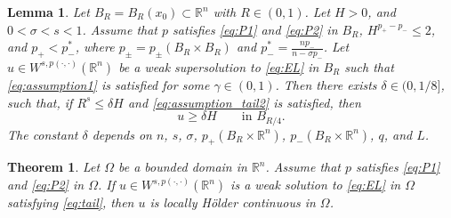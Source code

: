 \documentclass[10pt,a4paper]{amsart}
\newtheorem{theorem}{Theorem}
\newtheorem{lemma}{Lemma}
\begin{document}
 \begin{lemma} \label{lem:growth}
Let $B_R = B_R(x_0) \subset \mathbb{R}^n$ with $R \in (0,1)$. Let $H > 0$, and $0<\sigma < s <1$. Assume that $p$ satisfies \eqref{eq:P1} and \eqref{eq:P2} in $B_R$, $H^{p_+ - p_-} \leq 2$, and $p_+ < p_-^\ast$, where $p_\pm = p_\pm(B_R \times B_R)$ and $p_-^\ast = \frac{np_-}{n-\sigma p_-}$. Let $u \in W^{s, p(\cdot,\cdot)}(\mathbb{R}^n)$ be a weak supersolution to \eqref{eq:EL} in $B_R$ such that
\eqref{eq:assumption1} is satisfied for some $\gamma\in(0,1)$. Then there exists $\delta\in(0,1/8]$, such that, if $R^s\leq \delta H$ and \eqref{eq:assumption_tail2} is satisfied, then
\begin{equation}\label{eq:lemgrowth}
 u \geq \delta H \qquad \text{in } B_{R/4}.
 \end{equation}
 The constant $\delta$ depends on $n$, $s$, $\sigma$, $p_+(B_R \times \mathbb{R}^n)$, $p_-(B_R \times \mathbb{R}^n)$, $q$, and $L$.
\end{lemma}

\begin{theorem} \label{thm:Holder}
Let $\Omega$ be a bounded domain in $\mathbb{R}^n$. Assume that $p$ satisfies \eqref{eq:P1} and \eqref{eq:P2} in $\Omega$. If $u \in W^{s, p(\cdot,\cdot)}(\mathbb{R}^n)$ is a weak solution to \eqref{eq:EL} in $\Omega$ satisfying \eqref{eq:tail}, then $u$ is locally H\"older continuous in $\Omega$.
\end{theorem}
\end{document}
